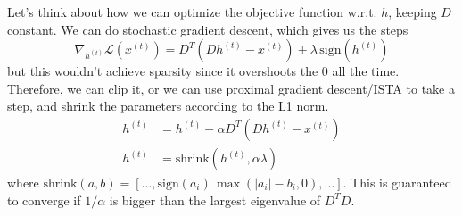   Let's think about how we can optimize the objective function w.r.t. $h$, keeping $D$ constant. We can do stochastic gradient descent, which gives us the steps
  \begin{equation}
    \nabla_{h^{(t)}} \mathcal{L}(x^{(t)}) = D^T (D h^{(t)} - x^{(t)}) + \lambda \, \mathrm{sign}(h^{(t)})
  \end{equation}
  but this wouldn't achieve sparsity since it overshoots the $0$ all the time. Therefore, we can clip it, or we can use proximal gradient descent/ISTA to take a step, and shrink the parameters according to the L1 norm. 
  \begin{align} 
    h^{(t)} & = h^{(t)} - \alpha D^T (D h^{(t)} - x^{(t)}) \\
    h^{(t)} & = \mathrm{shrink}(h^{(t)}, \alpha \lambda)
  \end{align}
  where $\mathrm{shrink}(a, b) = [\ldots, \mathrm{sign}(a_i)\, \max(|a_i| - b_i, 0), \ldots]$. This is guaranteed to converge if $1/\alpha$ is bigger than the largest eigenvalue of $D^T D$.  

